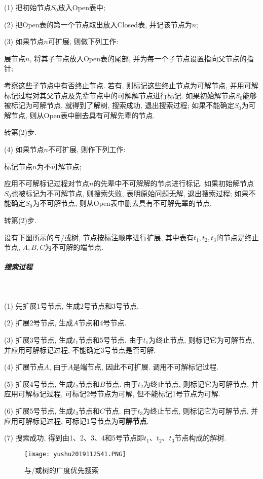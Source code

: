 (1) 把初始节点$S_0$放入Open表中;

(2) 把Open表的第一个节点取出放入Closed表, 并记该节点为$n$;

(3) 如果节点$n$可扩展, 则做下列工作:

      展节点$n$, 将其子节点放入Open表的尾部, 并为每一个子节点设置指向父节点的指针;

       考察这些子节点中有否终止节点. 若有, 则标记这些终止节点为可解节点, 并用可解标记过程对其父节点及先辈节点中的可解解节点进行标记.
     如果初始解节点$S_0$能够被标记为可解节点, 就得到了解树, 搜索成功, 退出搜索过程;
        如果不能确定$S_0$为可解节点, 则从Open表中删去具有可解先辈的节点.

      转第(2)步.

(4) 如果节点$n$不可扩展, 则作下列工作:

     标记节点$n$为不可解节点;

     应用不可解标记过程对节点$n$的先辈中不可解解的节点进行标记. 如果初始解节点$S_0$也被标记为不可解节点, 则搜索失败, 表明原始问题无解, 退出搜索过程; 如果不能确定$S_0$为不可解节点, 则从Open表中删去具有不可解先辈的节点.

     转第(2)步.
\begin{example}
  设有下图所示的与/或树, 节点按标注顺序进行扩展, 其中表有$t_1,t_2,t_3$的节点是终止节点, $A,B,C$为不可解的端节点.
\end{example}
\subparagraph{搜索过程}~{}

(1) 先扩展1号节点, 生成2号节点和3号节点.

(2) 扩展2号节点, 生成$A$节点和4号节点.

(3) 扩展3号节点, 生成$t_1$节点和5号节点. 由于$t_1$为终止节点, 则标记它为可解节点, 并应用可解标记过程, 不能确定3号节点是否可解.

(4)  扩展节点$A$, 由于$A$是端节点, 因此不可扩展. 调用不可解标记过程.

(5) 扩展4号节点, 生成$t_2$节点和$B$节点. 由于$t_2$为终止节点, 则标记它为可解节点, 并应用可解标记过程, 可标记2号节点为可解, 但不能标记1号节点为可解.

(6) 扩展5号节点, 生成$t_3$节点和$C$节点. 由于$t_3$为终止节点, 则标记它为可解节点, 并应用可解标记过程, 可标记1号节点为\textbf{可解节点}.

(7) 搜索成功, 得到由1、2、3、4和5号节点即$t_1$、$t_2$、$t_3$节点构成的解树.
\begin{figure}[H]
\centering
\texttt{[image: yushu2019112541.PNG]}
\caption{与/或树的广度优先搜索}
\label{AI32fig41}
\end{figure}
